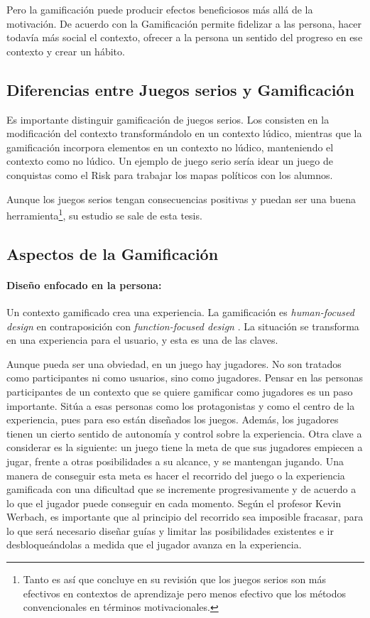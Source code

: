 Pero la gamificación puede producir efectos beneficiosos más allá de la motivación.
% 
De acuerdo con \cite{kwerb-WhyGamify} la Gamificación permite fidelizar a las persona, hacer todavía más social el contexto, ofrecer a la persona un sentido del progreso en ese contexto y crear un hábito.


\subsection{Diferencias entre Juegos serios y Gamificación}

Es importante distinguir gamificación de juegos serios. Los  consisten en la modificación del contexto transformándolo en un contexto lúdico, mientras que la gamificación incorpora elementos en un contexto no lúdico, manteniendo el contexto como no lúdico.
%
Un ejemplo de juego serio sería idear un juego de conquistas como el Risk para trabajar los mapas políticos con los alumnos. 

Aunque los juegos serios tengan consecuencias positivas y puedan ser una buena herramienta\footnote{Tanto es así que \cite{MetaSerious} concluye en su revisión que los juegos serios son más efectivos en contextos de aprendizaje pero menos efectivo que los métodos convencionales en términos motivacionales.}, su estudio se sale de esta tesis.

\subsection{Aspectos de la Gamificación}

\paragraph{Diseño enfocado en la persona:} 
Un contexto gamificado crea una experiencia.
%
La gamificación es \textit{human-focused design} en contraposición con \textit{function-focused design} \cite{BeyondPBL}.
%
La situación se transforma en una experiencia para el usuario, y esta es una de las claves.

Aunque pueda ser una obviedad, en un juego hay jugadores. No son tratados como participantes ni como usuarios, sino como jugadores.
%
Pensar en las personas participantes de un contexto que se quiere gamificar como jugadores es un paso importante.
%
Sitúa a esas personas como los protagonistas y como el centro de la experiencia, pues para eso están diseñados los juegos.
%
Además, los jugadores tienen un cierto sentido de autonomía y control sobre la experiencia.
%
Otra clave a considerar es la siguiente: un juego tiene la meta de que sus jugadores empiecen a jugar, frente a otras posibilidades a su alcance, y se mantengan jugando.
%
Una manera de conseguir esta meta es hacer el recorrido del juego o la experiencia gamificada con una dificultad que se incremente progresivamente y de acuerdo a lo que el jugador puede conseguir en cada momento. 
%
Según el profesor Kevin Werbach, es importante que al principio del recorrido sea imposible fracasar, para lo que será necesario diseñar guías y limitar las posibilidades existentes e ir desbloqueándolas a medida que el jugador avanza en la experiencia.


